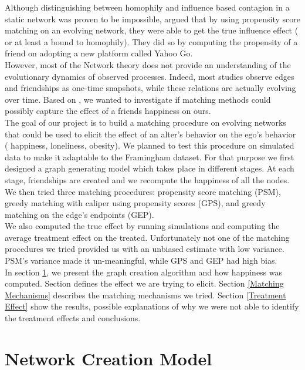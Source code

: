 \documentclass[11pt]{article}
\begin{document}
Although distinguishing between homophily and influence based contagion in a static network was proven to be impossible, \cite{aral2009distinguishing} argued that by using propensity score matching on an evolving network, they were able to get the true influence effect ( or at least a bound to homophily). They did so by computing the propensity of a friend on adopting a new platform called Yahoo Go.\\

However, most of the Network theory does not provide an understanding of the evolutionary dynamics of observed processes. Indeed, most studies observe edges and friendships as one-time snapshots, while these relations are actually evolving over time. Based on \cite{aral2009distinguishing}, we wanted to investigate if matching methods could possibly capture the effect of a friends happiness on ours.\\

The goal of our project is to build a matching procedure on evolving networks that could be used to elicit the effect of an alter’s behavior on the ego’s behavior ( happiness, loneliness, obesity). We planned to test this procedure on simulated data to make it adaptable to the Framingham dataset. For that purpose we first designed a graph generating model which takes place in different stages. At each stage, friendships are created and we recompute the happiness of all the nodes. We then tried three matching procedures: propensity score matching (PSM), greedy matching with caliper using propensity scores (GPS), and greedy matching on the edge’s endpoints (GEP).\\

We also computed the true effect by running simulations and computing the average treatment effect on the treated. Unfortunately not one of the matching procedures we tried provided us with an unbiased estimate with low variance. PSM’s variance made it un-meaningful, while GPS and GEP had high bias.\\

In section \ref{Network Creation Model}, we present the graph creation algorithm and how happiness was computed. Section defines the effect we are trying to elicit. Section \ref{Matching Mechanisms} describes the matching mechanisms we tried. Section \ref{Treatment Effect} show the results, possible explanations of why we were not able to identify the treatment effects and conclusions.\\

\section{Network Creation Model} \label{Network Creation Model}
\end{document}

